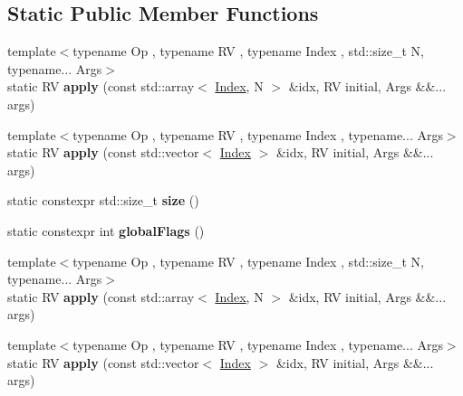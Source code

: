 \subsection*{Static Public Member Functions}
\begin{DoxyCompactItemize}
\item 
\mbox{\label{class_eigen_1_1_static_s_group_a30eb05c9b67e54aa8ab4f7941351f359}} 
{\footnotesize template$<$typename Op , typename RV , typename Index , std\+::size\+\_\+t N, typename... Args$>$ }\\static RV {\bfseries apply} (const std\+::array$<$ \hyperlink{namespace_eigen_a62e77e0933482dafde8fe197d9a2cfde}{Index}, N $>$ \&idx, RV initial, Args \&\&... args)
\item 
\mbox{\label{class_eigen_1_1_static_s_group_abe6337934907bdf5df53e491bddaf542}} 
{\footnotesize template$<$typename Op , typename RV , typename Index , typename... Args$>$ }\\static RV {\bfseries apply} (const std\+::vector$<$ \hyperlink{namespace_eigen_a62e77e0933482dafde8fe197d9a2cfde}{Index} $>$ \&idx, RV initial, Args \&\&... args)
\item 
\mbox{\label{class_eigen_1_1_static_s_group_a5b66f953f928ef6991071e7e9a2b1d17}} 
static constexpr std\+::size\+\_\+t {\bfseries size} ()
\item 
\mbox{\label{class_eigen_1_1_static_s_group_a3f2a5db32ba88188eb9fdcedcde616ac}} 
static constexpr int {\bfseries global\+Flags} ()
\item 
\mbox{\label{class_eigen_1_1_static_s_group_a30eb05c9b67e54aa8ab4f7941351f359}} 
{\footnotesize template$<$typename Op , typename RV , typename Index , std\+::size\+\_\+t N, typename... Args$>$ }\\static RV {\bfseries apply} (const std\+::array$<$ \hyperlink{namespace_eigen_a62e77e0933482dafde8fe197d9a2cfde}{Index}, N $>$ \&idx, RV initial, Args \&\&... args)
\item 
\mbox{\label{class_eigen_1_1_static_s_group_abe6337934907bdf5df53e491bddaf542}} 
{\footnotesize template$<$typename Op , typename RV , typename Index , typename... Args$>$ }\\static RV {\bfseries apply} (const std\+::vector$<$ \hyperlink{namespace_eigen_a62e77e0933482dafde8fe197d9a2cfde}{Index} $>$ \&idx, RV initial, Args \&\&... args)

\end{DoxyCompactItemize}
